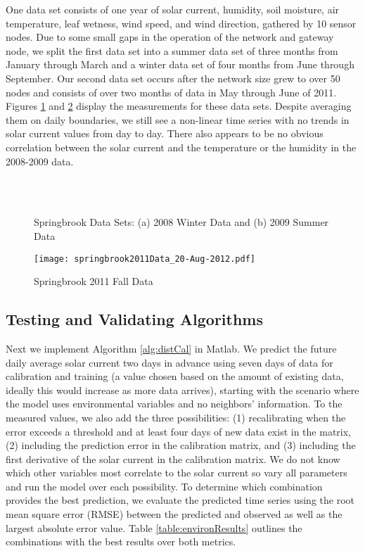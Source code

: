 \documentclass[prodmode,acmtosn]{acmsmall}
\begin{document}
One data set consists of one year of solar current, humidity, soil moisture, air temperature, leaf wetness, wind speed, and wind direction, gathered by 10 sensor nodes.
Due to some small gaps in the operation of the network and gateway node, we split the first data set into a summer data set of three months from January through March and a winter data set of four months from June through September.
Our second data set occurs after the network size grew to over 50 nodes and consists of over two months of data in May through June of 2011.
Figures \ref{fig:springbrook2008Data} and \ref{fig:springbrook2011Data} display the measurements for these data sets.
Despite averaging them on daily boundaries, we still see a non-linear time series with no trends in solar current values from day to day.
There also appears to be no obvious correlation between the solar current and the temperature or the humidity in the 2008-2009  data.

\begin{figure}
\centering
  \\
  \\
\caption{Springbrook Data Sets: (a) 2008 Winter Data and (b) 2009 Summer Data}
\label{fig:springbrook2008Data}
\end{figure}

\begin{figure}
\centering
  \texttt{[image: springbrook2011Data\_20-Aug-2012.pdf]}
\caption{Springbrook 2011 Fall Data}
\label{fig:springbrook2011Data}
\end{figure}

\subsection{Testing and Validating Algorithms}
Next we implement Algorithm \ref{alg:distCal} in Matlab.
We predict the future daily average solar current two days in advance using seven days of data for calibration and training (a value chosen based on the amount of existing data, ideally this would increase as more data arrives), starting with the scenario where the model uses environmental variables and no neighbors' information.
To the measured values, we also add the three possibilities: (1) recalibrating when the error exceeds a threshold and at least four days of new data exist in the matrix, (2) including the prediction error in the calibration matrix, and (3) including the first derivative of the solar current in the calibration matrix.
We do not know which other variables most correlate to the solar current so vary all parameters and run the model over each possibility.
To determine which combination provides the best prediction, we evaluate the predicted time series using the root mean square error (RMSE) between the predicted and observed as well as the largest absolute error value.
Table \ref{table:environResults} outlines the combinations with the best results over both metrics.
\end{document}
